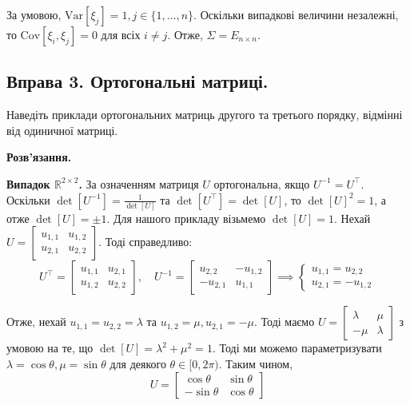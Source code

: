 \documentclass{hw_template}
\begin{document}
За умовою, $\text{Var}[\xi_j] = 1, j \in \{1,\dots,n\}$. Оскільки випадкові величини незалежні, то $\text{Cov}[\xi_i,\xi_j] = 0$ для всіх $i \neq j$. Отже, $\Sigma = E_{n \times n}$.

\subsection{Вправа 3. Ортогональні матриці.}

\begin{problem}
    Наведіть приклади ортогональних матриць другого та третього порядку, відмінні від одиничної матриці.
\end{problem}

\textbf{Розв'язання.} 

\textbf{Випадок $\mathbb{R}^{2\times 2}$.} За означенням матриця $U$ ортогональна, якщо $U^{-1} = U^{\top}$. Оскільки $\det[U^{-1}] = \frac{1}{\det[U]}$ та $\det[U^{\top}]=\det[U]$, то $\det[U]^2 = 1$, а отже $\det[U] = \pm 1$. Для нашого прикладу візьмемо $\det[U] = 1$. Нехай $U = \begin{bmatrix}
    u_{1,1} & u_{1,2} \\
    u_{2,1} & u_{2,2}
\end{bmatrix}$. Тоді справедливо:
\begin{equation*}
    U^{\top} = \begin{bmatrix}
        u_{1,1} & u_{2,1} \\
        u_{1,2} & u_{2,2}
    \end{bmatrix}, \quad U^{-1} = \begin{bmatrix}
        u_{2,2} & -u_{1,2} \\
        -u_{2,1} & u_{1,1}
    \end{bmatrix} \implies \begin{cases}
        u_{1,1} = u_{2,2} \\
        u_{2,1} = -u_{1,2}
    \end{cases}
\end{equation*}

Отже, нехай $u_{1,1}=u_{2,2}=\lambda$ та $u_{1,2}=\mu,u_{2,1}=-\mu$. Тоді маємо $U=\begin{bmatrix}
    \lambda & \mu \\
    -\mu & \lambda
\end{bmatrix}$ з умовою на те, що $\det[U]=\lambda^2+\mu^2=1$. Тоді ми можемо параметризувати $\lambda = \cos\theta, \mu=\sin\theta$ для деякого $\theta \in [0,2\pi)$. Таким чином, 
\begin{equation*}
    U = \begin{bmatrix}
        \cos\theta & \sin\theta \\
        -\sin\theta & \cos\theta
    \end{bmatrix}
\end{equation*}
\end{document}
